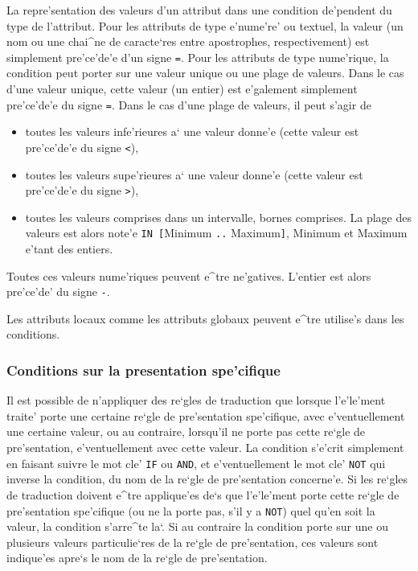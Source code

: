 {\label{relatattr}
La repre'sentation des valeurs d'un attribut dans une condition de'pendent
du type de l'attribut. Pour les attributs de type e'nume're' ou textuel, la
valeur (un nom ou une chai^ne de caracte`res entre apostrophes,
respectivement) est simplement pre'ce'de'e d'un signe {\tt =}. Pour les
attributs de type nume'rique, la condition peut porter sur une valeur unique
ou une plage de valeurs. Dans le cas d'une valeur unique, cette valeur
(un entier) est e'galement simplement pre'ce'de'e du signe {\tt =}. Dans
le cas d'une plage de valeurs, il peut s'agir de
\begin{itemize}
\item
toutes les valeurs infe'rieures a` une valeur donne'e (cette valeur est
pre'ce'de'e du signe {\tt <}),
\item
toutes les valeurs supe'rieures a` une valeur donne'e (cette valeur est
pre'ce'de'e du signe {\tt >}),
\item
toutes les valeurs comprises dans un intervalle, bornes comprises. La plage
des valeurs est alors note'e {\tt IN [}Minimum {\tt ..} Maximum{\tt]}, Minimum
et Maximum e'tant des entiers.
\end{itemize}
Toutes ces valeurs nume'riques peuvent e^tre ne'gatives. L'entier est alors
pre'ce'de' du signe {\tt -}.

Les attributs locaux comme les attributs globaux peuvent e^tre utilise's dans
les conditions.

\subsubsection{Conditions sur la presentation spe'cifique}

Il est possible de n'appliquer des re`gles de traduction que lorsque
l'e'le'ment traite' porte une certaine re`gle de pre'sentation spe'cifique,
avec e'ventuellement une certaine valeur, ou au contraire, lorsqu'il ne porte
pas cette re`gle de pre'sentation, e'ventuellement avec cette valeur.
La condition s'e'crit simplement en faisant suivre le mot cle' {\tt IF}
ou {\tt AND}, et e'ventuellement le mot cle' {\tt NOT} qui inverse
la condition, du nom de la re`gle de pre'sentation concerne'e. Si les re`gles
de traduction doivent e^tre applique'es de`s que l'e'le'ment porte cette
re`gle de pre'sentation spe'cifique (ou ne la porte pas, s'il y a {\tt NOT})
quel qu'en soit la valeur, la condition s'arre^te la`. Si au contraire la
condition porte sur une ou plusieurs valeurs particulie`res de la re`gle
de pre'sentation, ces valeurs sont indique'es apre`s le nom de la re`gle
de pre'sentation.

}
